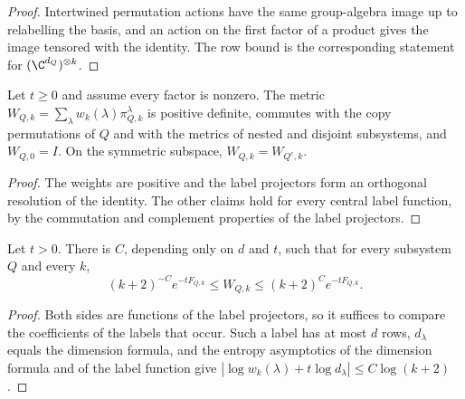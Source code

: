 \begin{proof}\leanok
    Intertwined permutation actions have the same group-algebra image up to
    relabelling the basis, and an action on the first factor of a product gives
    the image tensored with the identity. The row bound is the corresponding
    statement for $(\C^{d_Q})^{\otimes k}$.
\end{proof}

\begin{theorem}
    \label{thm:replica_metric_basic}
    \leanok
    Let $t\ge0$ and assume every factor is nonzero. The metric
    $W_{Q,k}=\sum_\lambda w_k(\lambda)\pi^\lambda_{Q,k}$ is positive definite,
    commutes with the copy permutations of $Q$ and with the metrics of nested and
    disjoint subsystems, and $W_{Q,0}=I$. On the symmetric subspace,
    $W_{Q,k}=W_{Q^c,k}$.
\end{theorem}

\begin{proof}\leanok
    The weights are positive and the label projectors form an orthogonal
    resolution of the identity. The other claims hold for every central label
    function, by the commutation and complement properties of the label
    projectors.
\end{proof}

\begin{theorem}
    \label{thm:replica_metric_comparison}
    \leanok
    Let $t>0$. There is $C$, depending only on $d$ and $t$, such that for every
    subsystem $Q$ and every $k$,
    \[
        (k+2)^{-C}e^{-tF_{Q,k}}\le W_{Q,k}\le(k+2)^Ce^{-tF_{Q,k}}.
    \]
\end{theorem}

\begin{proof}\leanok
    Both sides are functions of the label projectors, so it suffices to compare
    the coefficients of the labels that occur. Such a label has at most $d$ rows,
    $d_\lambda$ equals the dimension formula, and the entropy asymptotics of the
    dimension formula and of the label function give
    $|\log w_k(\lambda)+t\log d_\lambda|\le C\log(k+2)$.
\end{proof}

